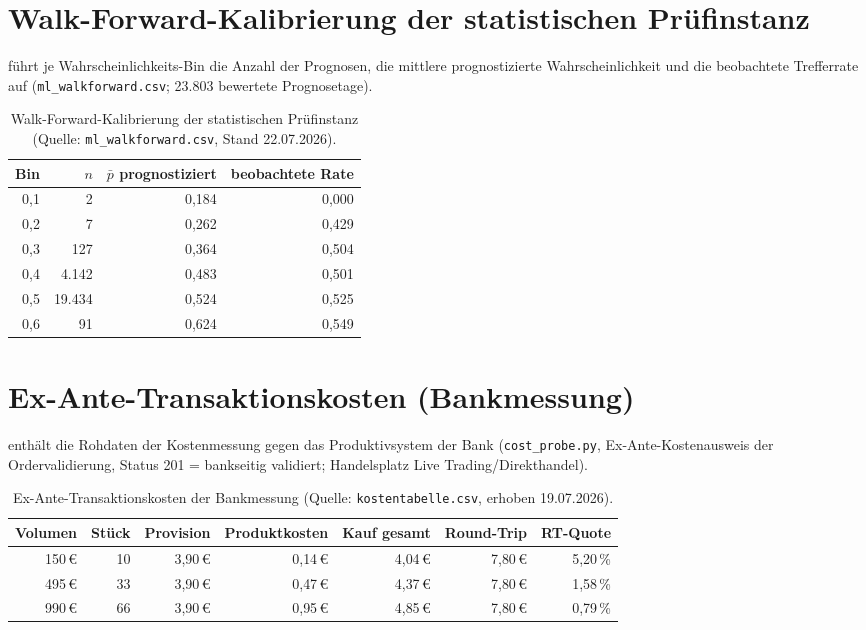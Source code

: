\section{Walk-Forward-Kalibrierung der statistischen Prüfinstanz}
\label{sec:anhang-walkforward}

 führt je Wahrscheinlichkeits-Bin die Anzahl der
Prognosen, die mittlere prognostizierte Wahrscheinlichkeit und die beobachtete
Trefferrate auf (\texttt{ml\_walkforward.csv}; 23.803 bewertete Prognosetage).

\begin{table}[htbp]
  \centering
  \caption[Walk-Forward-Kalibrierung der statistischen Prüfinstanz]{%
    Walk-Forward-Kalibrierung der statistischen Prüfinstanz
    (Quelle: \texttt{ml\_walkforward.csv}, Stand 22.07.2026).\quelleeigen}
  \label{tab:anhang-walkforward}
  \begin{tabular}{r r r r}
    \hline
    Bin & $n$ & $\bar{p}$ prognostiziert & beobachtete Rate \\
    \hline
    0{,}1 & 2      & 0{,}184 & 0{,}000 \\
    0{,}2 & 7      & 0{,}262 & 0{,}429 \\
    0{,}3 & 127    & 0{,}364 & 0{,}504 \\
    0{,}4 & 4.142  & 0{,}483 & 0{,}501 \\
    0{,}5 & 19.434 & 0{,}524 & 0{,}525 \\
    0{,}6 & 91     & 0{,}624 & 0{,}549 \\
    \hline
  \end{tabular}
\end{table}

\section{Ex-Ante-Transaktionskosten (Bankmessung)}
\label{sec:anhang-kosten}

 enthält die Rohdaten der Kostenmessung gegen das
Produktivsystem der Bank (\texttt{cost\_probe.py}, Ex-Ante-Kostenausweis der
Ordervalidierung, Status 201 = bankseitig validiert; Handelsplatz Live
Trading/Direkthandel).

\begin{table}[htbp]
  \centering
  \caption[Ex-Ante-Transaktionskosten der Bankmessung]{%
    Ex-Ante-Transaktionskosten der Bankmessung
    (Quelle: \texttt{kostentabelle.csv}, erhoben 19.07.2026).\quelleeigen}
  \label{tab:anhang-kosten}
  \begin{tabular}{r r r r r r r}
    \hline
    Volumen & Stück & Provision & Produktkosten & Kauf gesamt & Round-Trip & RT-Quote \\
    \hline
    150\,€ & 10 & 3{,}90\,€ & 0{,}14\,€ & 4{,}04\,€ & 7{,}80\,€ & 5{,}20\,\% \\
    495\,€ & 33 & 3{,}90\,€ & 0{,}47\,€ & 4{,}37\,€ & 7{,}80\,€ & 1{,}58\,\% \\
    990\,€ & 66 & 3{,}90\,€ & 0{,}95\,€ & 4{,}85\,€ & 7{,}80\,€ & 0{,}79\,\% \\
    \hline
  \end{tabular}
\end{table}

